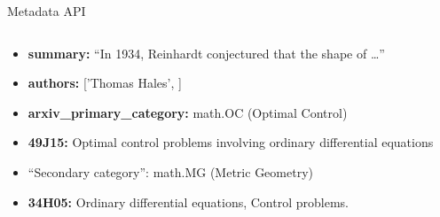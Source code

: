 \documentclass[9pt]{beamer}
\begin{document}
\begin{frame}{Metadata API}
\begin{columns}[T]
\begin{column}{0.6\textwidth}
\begin{itemize}
                \item \textbf{summary:} ``In 1934, Reinhardt conjectured that the shape of \ldots''
                \item \textbf{authors:} ['Thomas Hales', ] 
                \item \textbf{arxiv\_primary\_category:} math.OC (Optimal Control)
                \item \textbf{49J15:} Optimal control problems involving ordinary differential equations
                        \item ``Secondary category'': math.MG (Metric Geometry)
                        \item \textbf{34H05:} Ordinary differential equations, Control problems.
                    \end{itemize}
        \end{column}
    \end{columns}
\end{frame}
\end{document}
